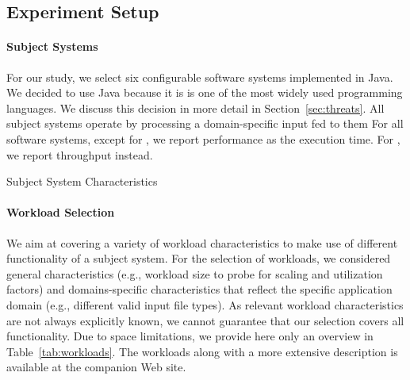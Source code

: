 \subsection{Experiment Setup}\label{sec:setup}
\paragraph{Subject Systems}
For our study, we select six configurable software systems implemented in Java. We decided to use Java because it is is one of the most widely used programming languages. We discuss this decision in more detail in Section~\ref{sec:threats}. 
All subject systems operate by processing a domain-specific input fed to them
For all software systems, except for \htwo, we report performance as the execution time. For \htwo, we report throughput instead. 
\begin{table}
	\footnotesize
	\centering
	\caption{Subject System Characteristics}
	
	\label{tab:subject_systems}
\end{table}
\paragraph{Workload Selection}
We aim at covering a variety of workload characteristics to make use of different functionality of a subject system. For the selection of workloads, we considered general characteristics (e.g., workload size to probe for scaling and utilization factors) and domains-specific characteristics that reflect the specific application domain (e.g., different valid input file types). As relevant workload characteristics are not always explicitly known, we cannot guarantee that our selection covers all functionality.
Due to space limitations, we provide here only an overview in Table~\ref{tab:workloads}. The workloads along with a more extensive description is available at the companion Web site. 

